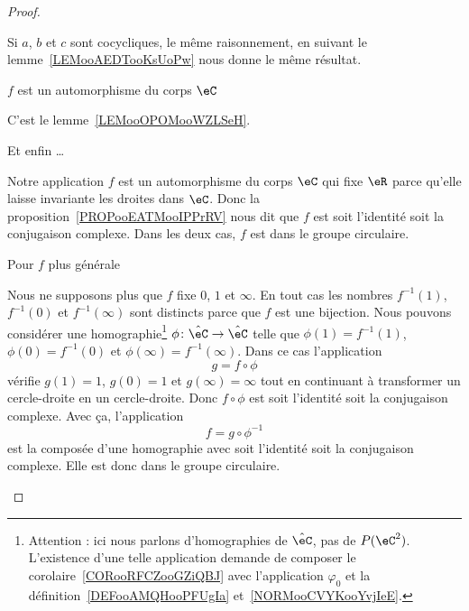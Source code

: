 \begin{proof}
\begin{subproof}
\begin{subproof}
			Si \( a\), \( b\) et \( c\) sont cocycliques, le même raisonnement, en suivant le lemme~\ref{LEMooAEDTooKsUoPw} nous donne le même résultat.

			\item[\( f\) est un automorphisme du corps \( \eC\)]

			C'est le lemme~\ref{LEMooOPOMooWZLSeH}.

			\item[Et enfin \ldots]

			Notre application \( f\) est un automorphisme du corps \( \eC\) qui fixe \( \eR\) parce qu'elle laisse invariante les droites dans \( \eC\). Donc la proposition~\ref{PROPooEATMooIPPrRV} nous dit que \( f\) est soit l'identité soit la conjugaison complexe. Dans les deux cas, \( f\) est dans le groupe circulaire.

		\end{subproof}

		\item[Pour \( f\) plus générale]

		Nous ne supposons plus que \( f\) fixe \( 0\), \( 1\) et \( \infty\). En tout cas les nombres \( f^{-1}(1)\), \( f^{-1}(0)\) et \( f^{-1}(\infty)\) sont distincts parce que \( f\) est une bijection. Nous pouvons considérer une homographie\footnote{Attention : ici nous parlons d'homographies de \( \hat \eC\), pas de \( P(\eC^2)\). L'existence d'une telle application demande de composer le corolaire~\ref{CORooRFCZooGZiQBJ} avec l'application \( \varphi_0\) et la définition~\ref{DEFooAMQHooPFUgIa} et~\ref{NORMooCVYKooYvjIeE}.} \( \phi\colon \hat \eC\to \hat \eC\) telle que \( \phi(1)=f^{-1}(1)\), \( \phi(0)=f^{-1}(0)\) et \( \phi(\infty)=f^{-1}(\infty)\). Dans ce cas l'application
		\begin{equation}
			g=f\circ\phi
		\end{equation}
		vérifie \( g(1)=1\), \( g(0)=1\) et \( g(\infty)=\infty\) tout en continuant à transformer un cercle-droite en un cercle-droite. Donc \( f\circ\phi\) est soit l'identité soit la conjugaison complexe. Avec ça, l'application
		\begin{equation}
			f=g\circ\phi^{-1}
		\end{equation}
		est la composée d'une homographie avec soit l'identité soit la conjugaison complexe. Elle est donc dans le groupe circulaire.
	\end{subproof}
\end{proof}


